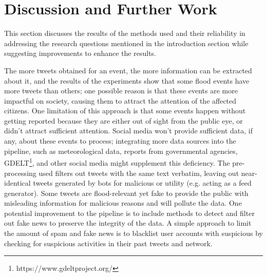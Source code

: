 \chapter{Discussion and Further Work}\label{sec:discussion_and_further_work}

This section discusses the results of the methods used and their reliability in addressing the
research questions mentioned in the introduction section while suggesting improvements to enhance
the results.

The more tweets obtained for an event, the more information can be extracted about it, and the
results of the experiments show that some flood events have more tweets than others; one possible
reason is that these events are more impactful on society, causing them to attract the attention of
the affected citizens. One limitation of this approach is that some events happen without getting
reported because they are either out of sight from the public eye, or didn't attract sufficient
attention. Social media won't provide sufficient data, if any, about these events to process;
integrating more data sources into the pipeline, such as meteorological data, reports from
governmental agencies, \ac{GDELT}\footnote{https://www.gdeltproject.org/}, and other social media
might supplement this deficiency. The pre-processing used filters out tweets with the same text
verbatim, leaving out near-identical tweets generated by bots for malicious or utility (e.g. acting
as a feed generator). Some tweets are flood-relevant yet fake to provide the public with misleading
information for malicious reasons and will pollute the data. One potential improvement to the
pipeline is to include methods to detect and filter out fake news to preserve the integrity of the
data. A simple approach to limit the amount of spam and fake news is to blacklist user accounts with
suspicious by checking for suspicious activities in their past tweets and network. 

